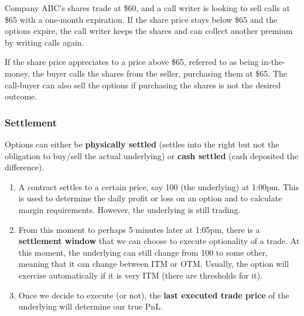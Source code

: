 \documentclass{article}
\begin{document}
      \begin{example}
        \label{ex:company-options}
        Company ABC's shares trade at \$60, and a call writer is looking to sell calls at \$65 with a one-month expiration. If the share price stays below \$65 and the options expire, the call writer keeps the shares and can collect another premium by writing calls again. 

        If the share price appreciates to a price above \$65, referred to as being in-the-money, the buyer calls the shares from the seller, purchasing them at \$65. The call-buyer can also sell the options if purchasing the shares is not the desired outcome.
      \end{example}

    \subsubsection{Settlement}

      Options can either be \textbf{physically settled} (settles into the right but not the obligation to buy/sell the actual underlying) or \textbf{cash settled} (cash deposited the difference). 
      \begin{enumerate}
        \item A contract settles to a certain price, say 100 (the underlying) at 1:00pm. This is used to determine the daily profit or loss on an option and to calculate margin requirements. However, the underlying is still trading. 

        \item From this moment to perhaps 5 minutes later at 1:05pm, there is a \textbf{settlement window} that we can choose to execute optionality of a trade. At this moment, the underlying can still change from 100 to some other, meaning that it can change between ITM or OTM. Usually, the option will exercise automatically if it is very ITM (there are thresholds for it). 

        \item Once we decide to execute (or not), the \textbf{last executed trade price} of the underlying will determine our true PnL. 
      \end{enumerate}
\end{document}
